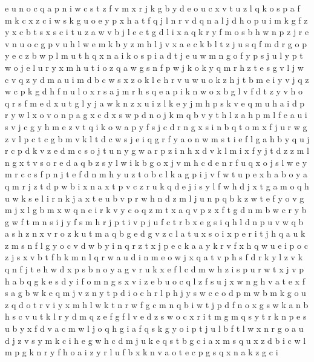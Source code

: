 \documentclass{article}
\begin{document}
e u n o c
q a p n i w c s t z f v m x r j k g b y d e o u
c x v t u z l q k
o s p a f m k c x
z c i w s k g u o e y p x h a t f q j l n r v d
q n a l j d h o p u i m k g f z y x c b t s
x s c i t u z a w v b j l e
c t g d l i x a q k r y f m o s b h w n p z j
r e v n u
o c g p v u h l w e m k b y
z m h l j
v x a e c k b l t z j u s q f m d r g o p y
e c z b w p l m u t h q x n a i k o s
p i a d t j e u
w m n g o f y p s j
u l y p t w o
j e l u
r y x m h u t i o z q a w g s n
f p w j k
o k y q m r h z t e s g v l j w c
v q z y d m a u
i m d b c w s x z o k l e h r v u
w u o k z h j
t b m e i y v j q z w c p k g d h f n u l o x r s a
j m r h s q e a p i k n w o x b g l v f d t z y
v h o q r s f m e d x u t g l y j a w k n z
x u i z l k e y j m
h p s k
v e q m u h a i d p r y w l x o
v o n p a g x c d
x s w p d n o j k m q b v y t h l z a
h p m l f e a u i s v j c g y
h m e z v t q i k o w a p y f s j c d r n g x
s i n b q t o m x f j u r w g z v l p c
t c g
b m v k l t d c w s j e i q g r f y a
o n w m s t i e f l g a h b y q u j r c p d k v z
e d m c s o j t u n y g w a r p z i
n h x d v k l m i
x f y j t d z
z
m l n g x t v s o r e d a q b
z s y l w i k b g o x j v m h c d e n r f u q
x o j s l w e y m r c
c s f
p n j t
e f d n m h y u z t o b c l k a g p i j v
f w
t u
p e x h a b
o y a q m r j z t d p w b i x
n a x t p v c z r u k q d e j i s y l f w h
d j x t g a m o q h u w k s e l i r n
k j a x t e u b v p r w h n d z m l
j
u n p q b k z w t e f y o v g m j x l
g b m x w q n e i r k v y
c o q z m
t x a
q v p z x f t g d n m
b w c r y
b g w f t m n s i j
y f s m
h r j p t i
v p j u f c t r b x e g s i q h l d n
p u v w q b a s h z n x
v r o z k u t m a q b g e d
g v z c l a t u x s o i
x p e r i t j h q a u k z m s n f l g y o c v d w b
y i n q r z t x j p e c k a
a y k r v f x h q w u
e i p o c z j s x v b t f h k m n l q r w a u d
i n m e o w j x q a t v p h s f d r k y l z
v k q n f j t e h w d x p s b
n o y a g v r u k x e f l c d m w h z i s p
u r w t x j v p h a b q g k e s d y i f o m n
g s x v i z e b u
o c q l z f s u j x w n g h v a t e
x f s a g b w k e q m j v z n y t p d i o c h r
l p
h j y s w c e o d p m
w b
m k g o u z
q d o t r v i y x m h l w k
t n r w
f g c m n q b i
w t j p d f n
o x g s w k a
n b h s c v u t k l r y d m q z e f g
f l v e d z s w o c x r i t m g
m q s y
t r k n p e s u b y x f d v a c m w l j o q h g i
a f q s k g y o i p t j u l
b f t l w x n r g o a u d j z v s y m k c i h e
g w h c d m j u k e q s t b
g c i a x m
s q u x z d b i c w l m p g k n r y f h o a
i z y r l u f b x k n v a o t e c p g s q
x n a k
z g c i
\end{document}
